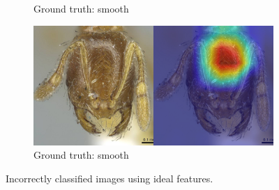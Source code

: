 \documentclass{aci}
\numberwithin{equation}{section}
\begin{document}
\begin{figure}
\begin{subfigure}{\subwidth}
        \caption{Ground truth: smooth}
        \label{fig:incorrect_ideal_177}
    \end{subfigure}
    \begin{subfigure}{\subwidth}
        \includegraphics[width=1\linewidth]{thesis_assets/gradcam/incorrect_ideal/197.png}
        \caption{Ground truth: smooth}
        \label{fig:incorrect_ideal_197}
    \end{subfigure}
    \caption{Incorrectly classified images using ideal features.}
    \label{fig:incorrect_ideal}
\end{figure}
\end{document}
